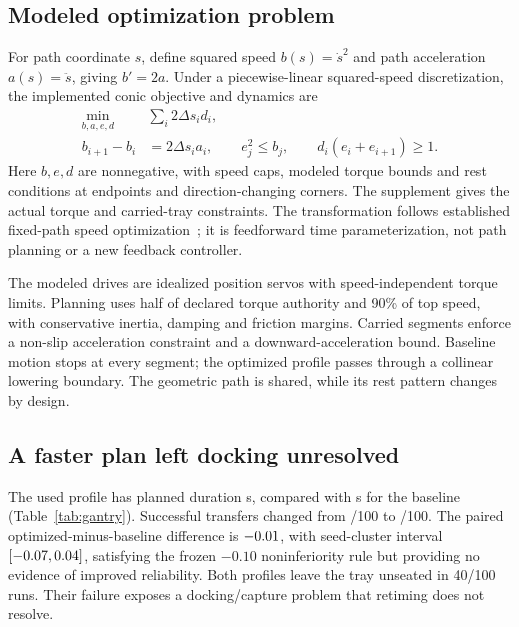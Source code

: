 \subsection{Modeled optimization problem}
For path coordinate $s$, define squared speed $b(s)=\dot s^2$ and path acceleration $a(s)=\ddot s$, giving $b'=2a$. Under a piecewise-linear squared-speed discretization, the implemented conic objective and dynamics are
\begin{align}
 \min_{b,a,e,d}\quad &\sum_i 2\Delta s_i d_i,\\
 b_{i+1}-b_i &= 2\Delta s_i a_i,\qquad
 e_j^2\le b_j,\qquad d_i(e_i+e_{i+1})\ge1.
\end{align}
Here $b,e,d$ are nonnegative, with speed caps, modeled torque bounds and rest conditions at endpoints and direction-changing corners. The supplement gives the actual torque and carried-tray constraints. The transformation follows established fixed-path speed optimization~\cite{lipp2014minimum}; it is feedforward time parameterization, not path planning or a new feedback controller.

The modeled drives are idealized position servos with speed-independent torque limits. Planning uses half of declared torque authority and 90\% of top speed, with conservative inertia, damping and friction margins. Carried segments enforce a non-slip acceleration constraint and a downward-acceleration bound. Baseline motion stops at every segment; the optimized profile passes through a collinear lowering boundary. The geometric path is shared, while its rest pattern changes by design.

\subsection{A faster plan left docking unresolved}
\begin{table}[tb]
\centering\small
\caption{Gantry outcomes on 100 paired simulated draws per profile. Planned duration excludes 0.6 s pre-settle and 1.0 s hold. Work denotes simulated mechanical work, not electrical energy. Unseated counts remain in the success denominator.}
\label{tab:gantry}
\end{table}
The used profile has planned duration \GantryOptimisedPrecise{} s, compared with \GantryBaselineTime{} s for the baseline (Table~\ref{tab:gantry}). Successful transfers changed from \GantryBaselinePass{}/100 to \GantryOptimisedPass{}/100. The paired optimized-minus-baseline difference is $-0.01{}$, with seed-cluster interval $[-0.07{},0.04{}]$, satisfying the frozen $-0.10$ noninferiority rule but providing no evidence of improved reliability. Both profiles leave the tray unseated in 40/100 runs. Their failure exposes a docking/capture problem that retiming does not resolve.

